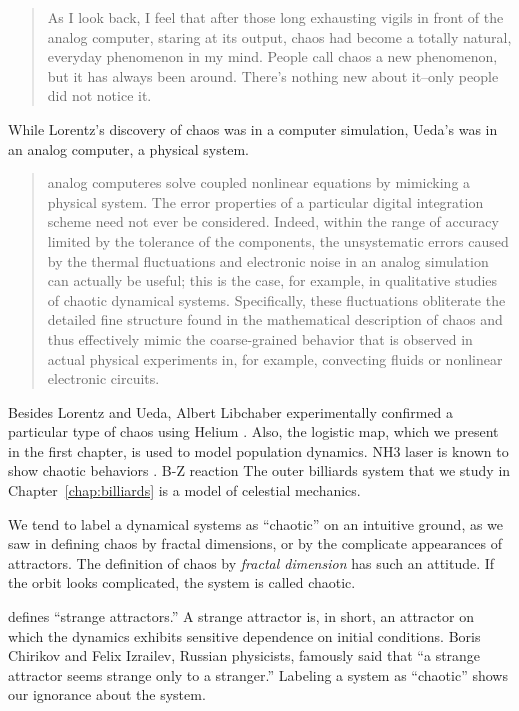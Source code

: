 \documentclass[10pt,twoside,draft]{book}
\begin{document}
\begin{quotation}
As I look back, I feel that after those long exhausting vigils in front of the analog computer, staring at its output, chaos had become a totally natural, everyday phenomenon in my mind.
People call chaos a new phenomenon, but it has always been around.
There's nothing new about it--only people did not notice it.
\citep[p.27]{ueda-abraham}
\end{quotation}
While Lorentz's discovery of chaos was in a computer simulation, Ueda's was in an analog computer, a physical system.
\citet[p.383]{campbell}
\begin{quotation}
  analog computeres solve coupled nonlinear equations by mimicking a physical system.
  The error properties of a particular digital integration scheme need not ever be considered.
  Indeed, within the range of accuracy limited by the tolerance of the components, the unsystematic errors caused by the thermal fluctuations and electronic noise in an analog simulation can actually be useful; this is the case, for example, in qualitative studies of chaotic dynamical systems.
  Specifically, these fluctuations obliterate the detailed fine structure found in the mathematical description of chaos and thus effectively mimic the coarse-grained behavior that is observed in actual physical experiments in, for example, convecting fluids or nonlinear electronic circuits.
\end{quotation}
Besides Lorentz and Ueda, Albert Libchaber experimentally confirmed a particular type of chaos using Helium \citep{gleick}.
Also, the logistic map, which we present in the first chapter, is used to model population dynamics.
NH3 laser is known to show chaotic behaviors \citep{kantz-schreiber}.
B-Z reaction
The outer billiards system that we study in Chapter~\ref{chap:billiards} is a model of celestial mechanics.


We tend to label a dynamical systems as ``chaotic'' on an intuitive ground, as we saw in defining chaos by fractal dimensions, or by the complicate appearances of attractors.
The definition of chaos by \textit{fractal dimension} has such an attitude.
If the orbit looks complicated, the system is called chaotic.


\citet{ruelle} defines ``strange attractors.'' 
A strange attractor is, in short, an attractor on which the dynamics exhibits sensitive dependence on initial conditions. \citep[p.11]{ott1994}
Boris Chirikov and Felix Izrailev, Russian physicists, famously said that ``a strange attractor seems strange only to a stranger.'' \citep{lorentzbook}
Labeling a system as ``chaotic'' shows our ignorance about the system.
\end{document}
